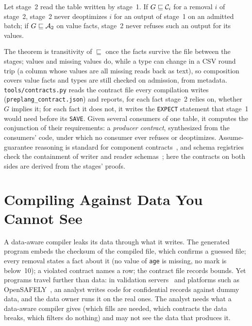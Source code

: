 \begin{theorem}[Composition]\label{thm:compose}
Let stage~2 read the table written by stage~1. If $G \sqsubseteq \mathcal{C}_{i}$ for a removal $i$ of
stage~2, stage~2 never deoptimizes $i$ for an output of stage~1 on an admitted batch; if
$G \sqsubseteq \mathcal{A}_2$ on value facts, stage~2 never refuses such an output for its values.
\end{theorem}

The theorem is transitivity of $\sqsubseteq$ once the facts survive the file between the stages;
values and missing values do, while a type can change in a CSV round trip (a column whose values are
all missing reads back as text), so composition covers value facts and types are still checked on
admission, from metadata. \texttt{tools/contracts.py} reads the contract file every compilation
writes (\texttt{preplang\_contract.json}) and reports, for each fact stage~2 relies on, whether $G$
implies it; for each fact it does not, it writes the \texttt{EXPECT} statement that stage~1 would
need before its \texttt{SAVE}. Given several consumers of one table, it computes the conjunction of
their requirements: a \emph{producer contract}, synthesized from the consumers' code, under which no
consumer ever refuses or deoptimizes. Assume-guarantee reasoning is standard for component
contracts~\cite{benveniste2018}, and schema registries check the containment of writer and reader
schemas~\cite{avro}; here the contracts on both sides are derived from the stages' proofs.

\section{Compiling Against Data You Cannot See}\label{sec:private}

A data-aware compiler leaks its data through what it writes. The generated program embeds the
checksum of the compiled file, which confirms a guessed file; every removal states a fact about it
(no value of \texttt{age} is missing, no mark is below~10); a violated contract names a row; the
contract file records bounds. Yet programs travel further than data: in validation
servers~\cite{barrientos2018} and platforms such as OpenSAFELY~\cite{williamson2020}, an analyst writes
code for confidential records against dummy data, and the data owner runs it on the real ones. The
analyst needs what a data-aware compiler gives (which fills are needed, which contracts the data
breaks, which filters do nothing) and may not see the data that produces it.

